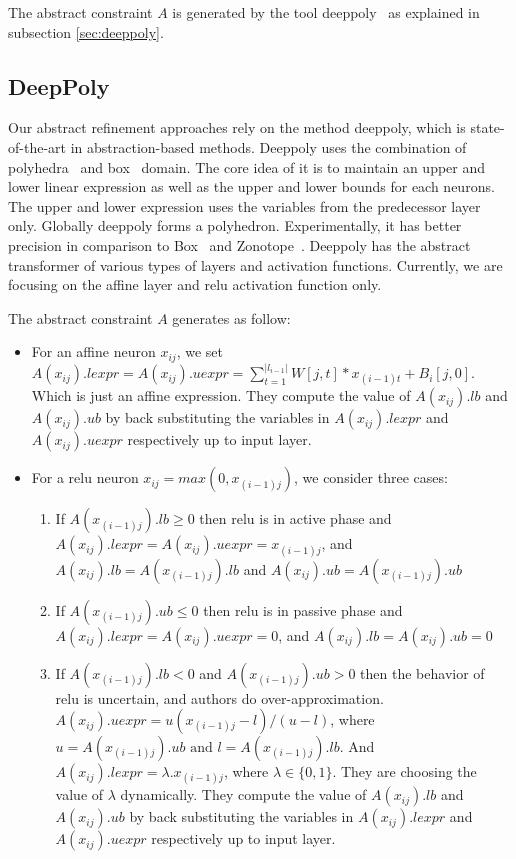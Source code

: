 The abstract constraint $A$ is generated by the tool deeppoly~\cite{} as explained in subsection \ref*{sec:deeppoly}. 


\subsection*{DeepPoly}
\label{sec:deeppoly}
Our abstract refinement approaches rely on the method deeppoly,
which is state-of-the-art in abstraction-based methods. Deeppoly uses the combination of
polyhedra~\cite{} and box~\cite{} domain. The core idea of it is to maintain an upper and lower linear
expression as well as the upper and lower bounds for each neurons. The upper and lower
expression uses the variables from the predecessor layer only. Globally deeppoly forms a
polyhedron. Experimentally, it has better precision in comparison to Box~\cite{} and Zonotope~\cite{}.
Deeppoly has the abstract transformer of various types of layers and activation functions. 
Currently, we are focusing on the affine layer and relu activation function only. 

The abstract constraint $A$ generates as follow: 
\begin{itemize}
    \item For an affine neuron $x_{ij}$, we set 
            $A(x_{ij}).lexpr = A(x_{ij}).uexpr = \sum_{t=1}^{|l_{i-1}|} W[j,t]*x_{(i-1)t} + B_i[j,0]$. Which is just an affine expression.
            They compute the value of $A(x_{ij}).lb$ and $A(x_{ij}).ub$ by back substituting the variables 
            in $A(x_{ij}).lexpr$ and $A(x_{ij}).uexpr$ respectively up to input layer.  
    \item For a relu neuron $x_{ij} = max(0,x_{(i-1)j})$, we consider three cases:
            \begin{enumerate}
                \item If $A(x_{(i-1)j}).lb \geq 0$ then relu is in active phase and $A(x_{ij}).lexpr = A(x_{ij}).uexpr = x_{(i-1)j}$,
                        and $A(x_{ij}).lb = A(x_{(i-1)j}).lb$ and $A(x_{ij}).ub = A(x_{(i-1)j}).ub$
                \item If $A(x_{(i-1)j}).ub \leq 0$ then relu is in passive phase and $A(x_{ij}).lexpr = A(x_{ij}).uexpr = 0$, 
                        and $A(x_{ij}).lb = A(x_{ij}).ub = 0$
                \item  If $A(x_{(i-1)j}).lb < 0$ and $A(x_{(i-1)j}).ub > 0$ then the behavior of relu is uncertain, and authors
                        do over-approximation. $A(x_{ij}).uexpr = u(x_{(i-1)j} - l) / (u - l)$, 
                        where $u = A(x_{(i-1)j}).ub \text{ and } l = A(x_{(i-1)j}).lb$.
                        And $A(x_{ij}).lexpr = \lambda . x_{(i-1)j}$, where $\lambda \in \{0,1\}$. 
                        They are choosing the value of $\lambda$ dynamically. They compute the value of $A(x_{ij}).lb$ and $A(x_{ij}).ub$ 
                        by back substituting the variables in $A(x_{ij}).lexpr$ and $A(x_{ij}).uexpr$ respectively up to input layer. 
            \end{enumerate} 
\end{itemize}




